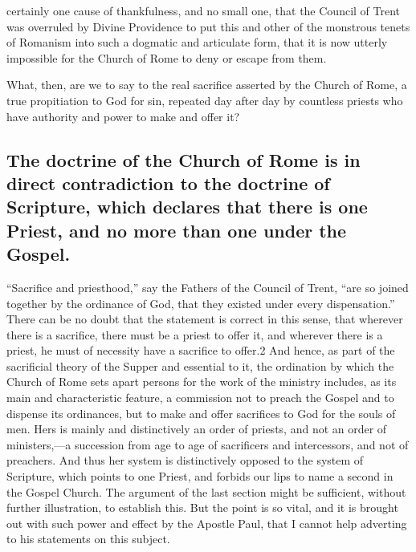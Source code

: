 \documentclass[]{book}
\begin{document}
certainly one cause of thankfulness, and no small one, that the Council of Trent was overruled by Divine Providence to put this and other of the monstrous tenets of Romanism into such a dogmatic and articulate form, that it is now utterly impossible for the Church of Rome to deny or escape from them.

What, then, are we to say to the real sacrifice asserted by the Church of Rome, a true propitiation to God for sin, repeated day after day by countless priests who have authority and power to make and offer it?

\hypertarget{the-doctrine-of-the-church-of-rome-is-in-direct-contradiction-to-the-doctrine-of-scripture-which-declares-that-there-is-one-priest-and-no-more-than-one-under-the-gospel.}{%
\subsection{The doctrine of the Church of Rome is in direct contradiction to the doctrine of Scripture, which declares that there is one Priest, and no more than one under the Gospel.}\label{the-doctrine-of-the-church-of-rome-is-in-direct-contradiction-to-the-doctrine-of-scripture-which-declares-that-there-is-one-priest-and-no-more-than-one-under-the-gospel.}}

``Sacrifice and priesthood,'' say the Fathers of the Council of Trent, ``are so joined together by the ordinance of God, that they existed under every dispensation.'' There can be no doubt that the statement is correct in this sense, that wherever there is a sacrifice, there must be a priest to offer it, and wherever there is a priest, he must of necessity have a sacrifice to offer.2 And hence, as part of the sacrificial theory of the Supper and essential to it, the ordination by which the Church of Rome sets apart persons for the work of the ministry includes, as its main and characteristic feature, a commission not to preach the Gospel and to dispense its ordinances, but to make and offer sacrifices to God for the souls of men. Hers is mainly and distinctively an order of priests, and not an order of ministers,---a succession from age to age of sacrificers and intercessors, and not of preachers. And thus her system is distinctively opposed to the system of Scripture, which points to one Priest, and forbids our lips to name a second in the Gospel Church. The argument of the last section might be sufficient, without further illustration, to establish this. But the point is so vital, and it is brought out with such power and effect by the Apostle Paul, that I cannot help adverting to his statements on this subject.
\end{document}

